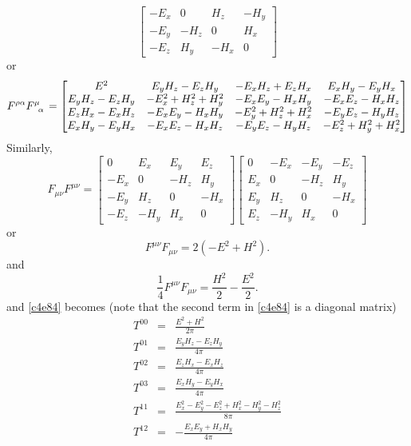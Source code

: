 \begin{enumerate}
\[\begin{bmatrix}
 -E_x & 0 & H_z & -H_y \\
 -E_y & -H_z & 0 & H_x \\
 -E_z & H_y & -H_x & 0 
 \end{bmatrix}
\]
or
\begin{equation}\label{c4e86}
F^{\rho\alpha}\tensor{F}{^\mu_\alpha} =
\begin{bmatrix} E^2 & E_yH_z - E_zH_y & -E_xH_z + E_zH_x & E_xH_y  - E_yH_x \\
 E_yH_z - E_zH_y & -E_x^2 + H_z^2 + H_y^2 & -E_xE_y -H_xH_y & -E_xE_z -H_xH_z \\
 E_zH_x - E_xH_z & -E_xE_y - H_xH_y & -E_y^2 + H_z^2 + H_x^2 & -E_yE_z - H_yH_z \\
 E_xH_y - E_yH_x & -E_xE_z -H_xH_z & -E_yE_z - H_yH_z & -E_z^2 + H_y^2 + H_x^2
 \end{bmatrix}
\end{equation}
Similarly,
\[
F_{\mu\nu}F^{\mu\nu} = \begin{bmatrix} 0 & E_x & E_y & E_z \\
-E_x & 0 & -H_z & H_y \\
-E_y & H_z & 0 & -H_x \\
-E_z & -H_y & H_x & 0
\end{bmatrix}\begin{bmatrix} 0 & -E_x & -E_y & -E_z \\
E_x & 0 & -H_z & H_y \\
E_y & H_z & 0 & -H_x \\
E_z & -H_y & H_x & 0
\end{bmatrix}
\]
or
\begin{equation}\label{c4e87}
F^{\mu\nu}F_{\mu\nu} = 2(-E^2 + H^2).
\end{equation}
and
\begin{equation}\label{c4e88}
\frac{1}{4}F^{\mu\nu}F_{\mu\nu} = \frac{H^2}{2} - \frac{E^2}{2}.
\end{equation}
and \eqref{c4e84} becomes (note that the second term in \eqref{c4e84} is a 
diagonal matrix)
\begin{eqnarray*}
T^{00} &=& \frac{E^2 + H^2}{2\pi} \\
T^{01} &=& \frac{E_yH_z - E_zH_y}{4\pi} \\
T^{02} &=& \frac{E_zH_x - E_xH_z}{4\pi} \\
T^{03} &=& \frac{E_xH_y - E_yH_x}{4\pi} \\
T^{11} &=& \frac{E_x^2 - E_y^2 - E_z^2 + H_x^2 - H_y^2 - H_z^2}{8\pi} \\
T^{12} &=& -\frac{E_xE_y + H_xH_y}{4\pi} \\

\end{eqnarray*}
\end{enumerate}
